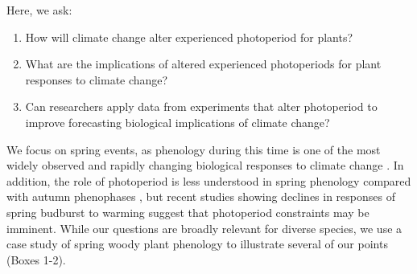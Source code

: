 \documentclass{article}
\begin{document}
\par Here, we ask: 
\begin{enumerate}
\item How will climate change alter experienced photoperiod for plants? 
\item What are the implications of altered experienced photoperiods for plant responses to climate change?
\item Can researchers apply data from experiments that alter photoperiod to improve forecasting biological implications of climate change?

\end{enumerate}
\par We focus on spring events, as phenology during this time is one of the most widely observed and rapidly changing biological responses to climate change \citep{parmesan2006}. In addition, the role of photoperiod is less understood in spring phenology compared with autumn phenophases \citep[reviewed in, e.g.,][]{azeez2015,gallinat2015,lagercrantz2009, allona2008}, but recent studies showing declines in responses of spring budburst to warming \citep[e.g.,][]{fu2019,gusewell2017,yu2010} suggest that photoperiod constraints may be imminent. While our questions are broadly relevant for diverse species, we use a case study of spring woody plant phenology to illustrate several of our points (Boxes 1-2). 
\end{document}
